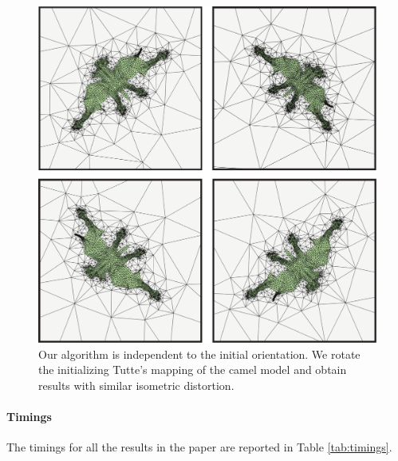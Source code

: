 \begin{figure}[t]
\centering
\includegraphics[width=\columnwidth]{scaf-tex/figs/random-rotate.pdf}
\caption{
{Our algorithm is independent to the initial orientation. We rotate the initializing Tutte's mapping of the camel model and obtain results with similar isometric distortion.}}
\vspace{-0.2cm}
\label{scaf:fig:random-rotate}
\end{figure}


\paragraph{Timings} The timings for all the results in the paper are reported in Table \ref{tab:timings}.

